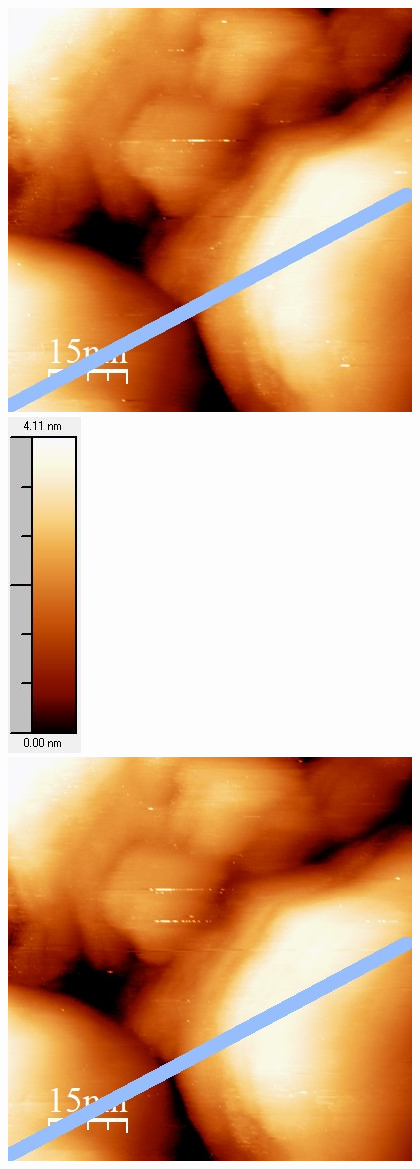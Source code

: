 \documentclass[12pt,a4paper]{article}
\begin{document}
\begin{figure}[H]
\centering
\includegraphics[scale=0.6]{Bilder/Anhang/Zeit/0_4_Zeit_vor.jpg}
\includegraphics[scale=0.6]{Bilder/Anhang/Zeit/0_4_Zeit_vor_Skala.jpg}
\includegraphics[scale=0.6]{Bilder/Anhang/Zeit/0_4_Zeit_nach.jpg}

\end{figure}
\end{document}
